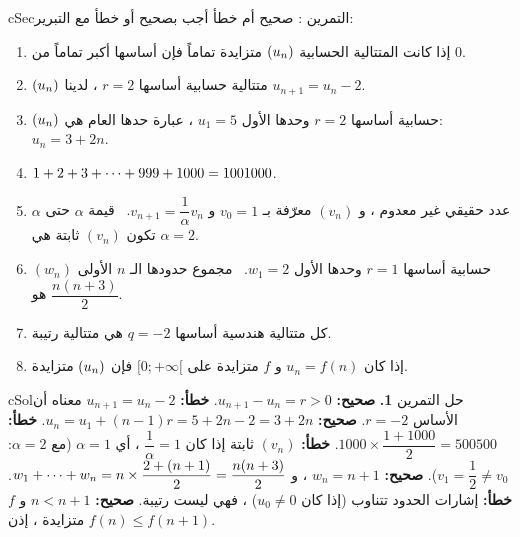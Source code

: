 \documentclass[12pt,a4paper]{article}
\newenvironment{BOX}[2]{\begin{otherlanguage}{english}\begin{arbox}{#1}{#2}}{\end{arbox}\end{otherlanguage}}
\newcounter{exo}
\newenvironment{tamrin}[1]{\stepcounter{exo}\begin{BOX}{cSec}{التمرين \theexo: #1}}{\end{BOX}}
\newenvironment{hal}{\Needspace{12\baselineskip}\begin{otherlanguage}{english}\begin{arbox}[breakable]{cSol}{حل التمرين \theexo}}{\end{arbox}\end{otherlanguage}}
\renewcommand{\cdots}{\mathinner{\cdotp\cdotp\cdotp}}
\begin{document}
\begin{tamrin}{صحيح أم خطأ}
أجب بصحيح أو خطأ مع التبرير:
\begin{enumerate}
\item إذا كانت المتتالية الحسابية $(u_n)$ متزايدة تماماً فإن أساسها أكبر تماماً من $0$.
\item $(u_n)$ متتالية حسابية أساسها $r=2$ ، لدينا $u_{n+1}=u_n-2$.
\item $(u_n)$ حسابية أساسها $r=2$ وحدها الأول $u_1=5$ ، عبارة حدها العام هي: $u_n=3+2n$.
\item $1+2+3+\cdots+999+1000=1001000$.
\item $\alpha$ عدد حقيقي غير معدوم ، و $(v_n)$ معرّفة بـ $v_0=1$ و $v_{n+1}=\dfrac1\alpha v_n$. \ قيمة $\alpha$ حتى تكون $(v_n)$ ثابتة هي $\alpha=2$.
\item $(w_n)$ حسابية أساسها $r=1$ وحدها الأول $w_1=2$. \ مجموع حدودها الـ $n$ الأولى هو $\dfrac{n(n+3)}{2}$.
\item كل متتالية هندسية أساسها $q=-2$ هي متتالية رتيبة.
\item إذا كان $u_n=f(n)$ و $f$ متزايدة على $[0;+\infty[$ فإن $(u_n)$ متزايدة.
\end{enumerate}
\end{tamrin}
\begin{hal}
\textbf{1.} \textbf{صحيح:} $u_{n+1}-u_n=r>0$.
 \textbf{خطأ:} $u_{n+1}=u_n-2$ معناه أن الأساس $r=-2$.
 \textbf{صحيح:} $u_n=u_1+(n-1)r=5+2n-2=3+2n$.
 \textbf{خطأ:} $1000\times\dfrac{1+1000}2=500500$.
 \textbf{خطأ:} $(v_n)$ ثابتة إذا كان $\dfrac1\alpha=1$ ، أي $\alpha=1$ (مع $\alpha=2$: $v_1=\dfrac12\ne v_0$).
 \textbf{صحيح:} $w_n=n+1$ ، و $w_1+\cdots+w_n=n\times\dfrac{2+(n+1)}{2}=\dfrac{n(n+3)}2$.
 \textbf{خطأ:} إشارات الحدود تتناوب (إذا كان $u_0\ne0$) ، فهي ليست رتيبة.
 \textbf{صحيح:} $n<n+1$ و $f$ متزايدة ، إذن $f(n)\le f(n+1)$.
\end{hal}

\end{document}
